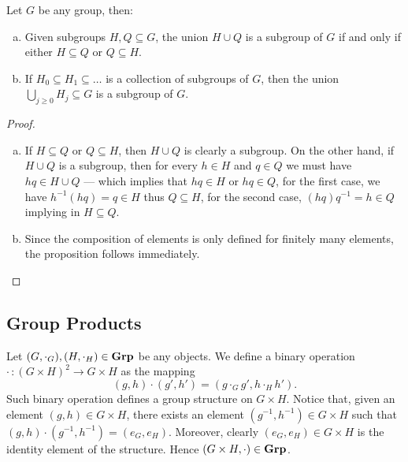 \begin{proposition}
\label{prop:union-of-subgroups}
Let \(G\) be any group, then:
\begin{enumerate}[(a)]\setlength\itemsep{0em}
\item Given subgroups \(H, Q \subseteq G\), the union \(H \cup Q\) is a subgroup
of \(G\) if and only if either \(H \subseteq Q\) or \(Q \subseteq H\).

\item If \(H_0 \subseteq H_1 \subseteq \dots\) is a collection of subgroups of
\(G\), then the union \(\bigcup_{j \geq 0} H_j \subseteq G\) is a subgroup of
\(G\).
\end{enumerate}
\end{proposition}

\begin{proof}
\begin{enumerate}[(a)]\setlength\itemsep{0em}
\item If \(H \subseteq Q\) or \(Q \subseteq H\), then \(H \cup Q\) is clearly a
subgroup. On the other hand, if \(H \cup Q\) is a subgroup, then for every \(h
\in H\) and \(q \in Q\) we must have \(hq \in H \cup Q\) --- which implies that
\(hq \in H\) or \(hq \in Q\), for the first case, we have \(h^{-1}(h q) = q
\in H\) thus \(Q \subseteq H\), for the second case, \((h q) q^{-1} = h \in Q\)
implying in \(H \subseteq Q\).

\item Since the composition of elements is only defined for finitely many
elements, the proposition follows immediately.
\end{enumerate}
\end{proof}

\subsection{Group Products}

Let \((G, \cdot_G), (H, \cdot_H) \in {\textbf{Grp}}\) be any objects. We define a
binary operation \(\cdot\,: (G \times H)^2 \to G \times H\) as the mapping
\begin{equation}\label{eq: grp-prod-bin}
(g, h) \cdot (g', h') = (g \cdot_G g', h \cdot_H h').
\end{equation}
Such binary operation defines a group structure on \(G \times H\). Notice that,
given an element \((g, h) \in G \times H\), there exists an element \((g^{-1},
h^{-1}) \in G \times H\) such that \((g, h) \cdot (g^{-1}, h^{-1}) = (e_G,
e_H)\). Moreover, clearly \((e_G, e_H) \in G \times H\) is the identity element
of the structure. Hence \((G \times H, \cdot) \in {\textbf{Grp}}\).

